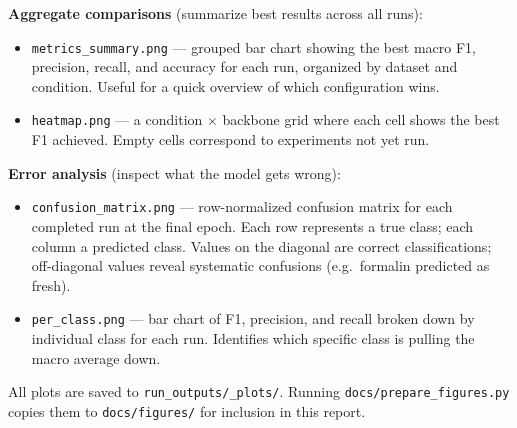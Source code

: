 \documentclass[12pt, a4paper]{article}
\begin{document}
\textbf{Aggregate comparisons} (summarize best results across all runs):
\begin{itemize}
    \item \texttt{metrics\_summary.png} --- grouped bar chart showing the
    best macro F1, precision, recall, and accuracy for each run, organized
    by dataset and condition.
    Useful for a quick overview of which configuration wins.
    \item \texttt{heatmap.png} --- a condition $\times$ backbone grid where
    each cell shows the best F1 achieved.
    Empty cells correspond to experiments not yet run.
\end{itemize}

\textbf{Error analysis} (inspect what the model gets wrong):
\begin{itemize}
    \item \texttt{confusion\_matrix.png} --- row-normalized confusion matrix
    for each completed run at the final epoch.
    Each row represents a true class; each column a predicted class.
    Values on the diagonal are correct classifications; off-diagonal values
    reveal systematic confusions (e.g.\ formalin predicted as fresh).
    \item \texttt{per\_class.png} --- bar chart of F1, precision, and recall
    broken down by individual class for each run.
    Identifies which specific class is pulling the macro average down.
\end{itemize}

All plots are saved to \texttt{run\_outputs/\_plots/}.
Running \texttt{docs/prepare\_figures.py} copies them to
\texttt{docs/figures/} for inclusion in this report.
\end{document}
